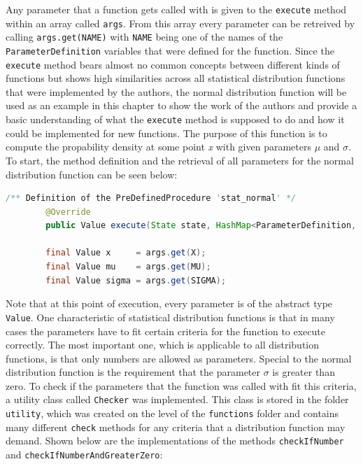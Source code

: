 Any parameter that a function gets called with is given to the \lstinline{execute} method within an array called \lstinline{args}. From this array every parameter can be retreived by calling \lstinline{args.get(NAME)} with \lstinline{NAME} being one of the names of the \lstinline{ParameterDefinition} variables that were defined for the function. Since the \lstinline{execute} 
method bears almost no common concepts between different kinds of functions but shows high similarities across all statistical distribution functions that were implemented by the authors, the normal distribution function will be used as an example in this chapter to show the work of the authors and provide a basic understanding of what the \lstinline{execute} method is supposed to do and how it could be implemented for new functions. The purpose of this function is to compute the propability density at some point \textit{x} with given parameters $\mu$ and $\sigma$. To start, the method definition and the retrieval of all parameters for the normal distribution function can be seen below:

\begin{center}
	\begin{lstlisting}[caption={Execute method and parameter retrieval}, language={java}, label=lis:parameterRetrieval]
		/** Definition of the PreDefinedProcedure 'stat_normal' */
		@Override
		public Value execute(State state, HashMap<ParameterDefinition, Value> args) throws SetlException {
		
        final Value x     = args.get(X);
        final Value mu    = args.get(MU);
        final Value sigma = args.get(SIGMA);
	\end{lstlisting}
\end{center}

 Note that at this point of execution, every parameter is of the abstract type \lstinline{Value}. One characteristic of statistical distribution functions is that in many cases the parameters have to fit certain criteria for the function to execute correctly. The most important one, which is applicable to all distribution functions, is that only numbers are allowed as parameters. Special to the normal distribution function is the requirement that the parameter $\sigma$ is greater than zero. To check if the parameters that the function was called with fit this criteria, a utility class called \lstinline{Checker} was implemented. This class is stored in the folder \lstinline{utility}, which was created on the level of the \lstinline{functions} folder and contains many different \lstinline{check} methods for any criteria that a distribution function may demand. Shown below are the implementations of the methods \lstinline{checkIfNumber} and \lstinline{checkIfNumberAndGreaterZero}:
 
